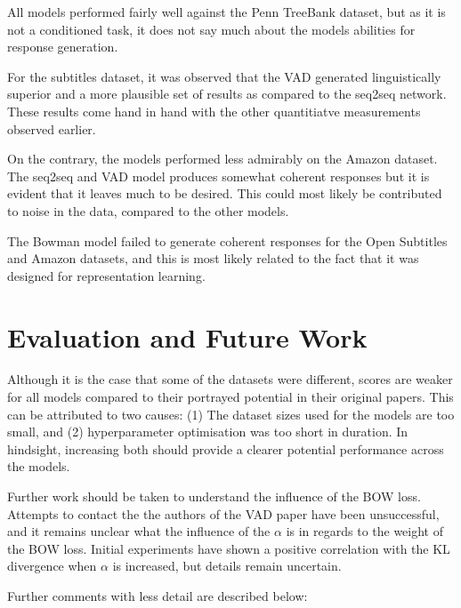 \documentclass[12pt,twoside]{report}
\begin{document}
All models performed fairly well against the Penn TreeBank dataset, but as it is not a conditioned task, it does not say much about the models abilities for response generation.

For the subtitles dataset, it was observed that the VAD generated linguistically superior and a more plausible set of results as compared to the seq2seq network. These results come hand in hand with the other quantitiatve measurements observed earlier.

On the contrary, the models performed less admirably on the Amazon dataset. The seq2seq and VAD model produces somewhat coherent responses but it is evident that it leaves much to be desired. This could most likely be contributed to noise in the data, compared to the other models.

The Bowman model failed to generate coherent responses for the Open Subtitles and Amazon datasets, and this is most likely related to the fact that it was designed for representation learning.

\chapter{Evaluation and Future Work}

Although it is the case that some of the datasets were different, scores are weaker for all models compared to their portrayed potential in their original papers. This can be attributed to two causes: (1) The dataset sizes used for the models are too small, and (2) hyperparameter optimisation was too short in duration. In hindsight, increasing both should provide a clearer potential performance across the models.

Further work should be taken to understand the influence of the BOW loss. Attempts to contact the the authors of the VAD paper have been unsuccessful, and it remains unclear what the influence of the $\alpha$ is in regards to the weight of the BOW loss. Initial experiments have shown a positive correlation with the KL divergence when $\alpha$ is increased, but details remain uncertain.

Further comments with less detail are described below:
\end{document}
